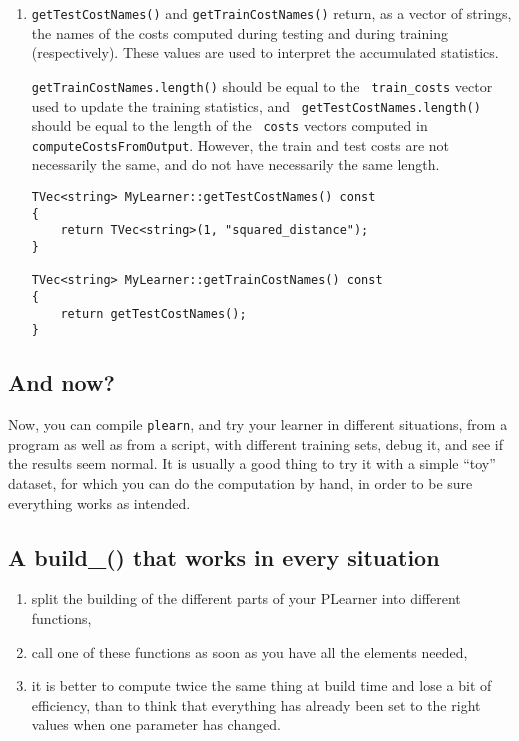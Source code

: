 \documentclass[11pt]{book}
\begin{document}
\begin{enumerate}
\item {\tt getTestCostNames()} and {\tt getTrainCostNames()} return, as
a vector of strings, the names of the costs computed during testing and
during training (respectively). These values are used to interpret the
accumulated statistics.

{\tt getTrainCostNames.length()} should be equal to the {\tt
train\_costs} vector used to update the training statistics, and {\tt
getTestCostNames.length()} should be equal to the length of the {\tt
costs} vectors computed in {\tt computeCostsFromOutput}. However, the
train and test costs are not necessarily the same, and do not have
necessarily the same length.
\begin{verbatim}
TVec<string> MyLearner::getTestCostNames() const
{
    return TVec<string>(1, "squared_distance");
}

TVec<string> MyLearner::getTrainCostNames() const
{
    return getTestCostNames();
}
\end{verbatim}

\end{enumerate}

\subsection{And now?}
Now, you can compile {\tt plearn}, and try your learner in different
situations, from a program as well as from a script, with different
training sets, debug it, and see if the results seem normal. It is
usually a good thing to try it with a simple “toy” dataset, for
which you can do the computation by hand, in order to be sure everything
works as intended.

\subsection{\label{plearner_build_}A build\_() that works in every situation}

\begin{enumerate}

\item split the building of the different parts of your PLearner into
different functions,

\item call one of these functions as soon as you have all the elements needed,

\item it is better to compute twice the same thing at build time and
lose a bit of efficiency, than to think that everything has already been
set to the right values when one parameter has changed.

\end{enumerate}
\end{document}
